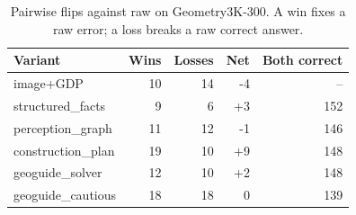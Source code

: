 \begin{table}[t]
\centering
\caption{Pairwise flips against raw on Geometry3K-300. A win fixes a raw error; a loss breaks a raw correct answer.}
\label{tab:pairwise-geometry300}
\small
\begin{tabular}{lrrrr}
\toprule
Variant & Wins & Losses & Net & Both correct \\
\midrule
image+GDP & 10 & 14 & -4 & -- \\
structured\_facts & 9 & 6 & +3 & 152 \\
perception\_graph & 11 & 12 & -1 & 146 \\
construction\_plan & 19 & 10 & +9 & 148 \\
geoguide\_solver & 12 & 10 & +2 & 148 \\
geoguide\_cautious & 18 & 18 & 0 & 139 \\
\bottomrule
\end{tabular}
\end{table}
